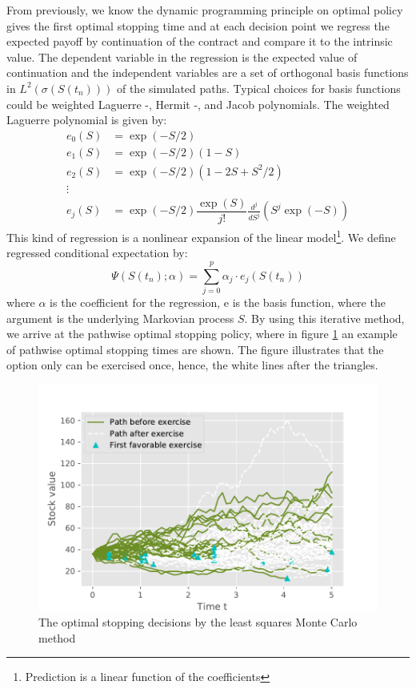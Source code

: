 From previously, we know the dynamic programming principle on optimal policy gives the first optimal stopping time and at each decision point we regress the expected payoff by continuation of the contract and compare it to the intrinsic value. The dependent variable in the regression is the expected value of continuation and the independent variables are a set of orthogonal basis functions in $L^2(\sigma(S(t_n)))$ of the simulated paths. Typical choices for basis functions could be weighted Laguerre -, Hermit -, and Jacob polynomials. The weighted Laguerre polynomial is given by:
\begin{align*}
e_0(S) &= \exp(-S/2) \\
e_1(S) &= \exp(-S/2) (1-S) \\
e_2(S) &= \exp(-S/2) (1-2S+S^2/2) \\
\vdots \\
e_j(S) &= \exp(-S/2) \dfrac{\exp(S)}{j!} \frac{d^j}{dS^j}(S^j \exp(-S)) 
\end{align*} 
This kind of regression is a nonlinear expansion of the linear model\footnote{Prediction is a linear function of the coefficients}. We define regressed conditional expectation by:
$$\Psi(S(t_n); \alpha)= \sum_{j=0}^p \alpha_j \cdot e_j(S(t_n)) $$
where $\alpha$ is the coefficient for the regression, e is the basis function, where the argument is the underlying Markovian process $S$. By using this iterative method, we arrive at the pathwise optimal stopping policy, where in figure \ref{fig:LSM2} an example of pathwise optimal stopping times are shown. The figure illustrates that the option only can be exercised once, hence, the white lines after the triangles.\\

\begin{figure}[th]
\centering
\includegraphics{Figures/LSMFit2.pdf}
\decoRule
\caption[Optimal Stopping Decision]{The optimal stopping decisions by the least squares Monte Carlo method}
\label{fig:LSM2}
\end{figure}

